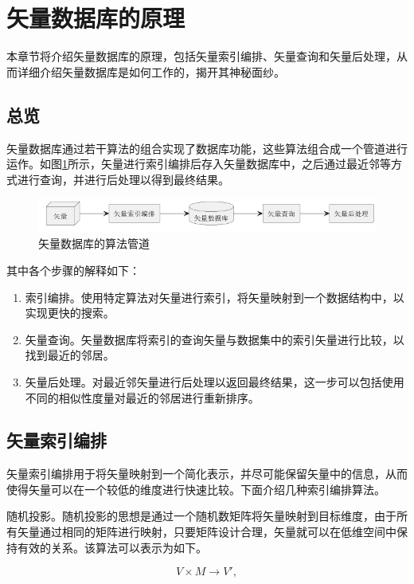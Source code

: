 \section{矢量数据库的原理}

本章节将介绍矢量数据库的原理，包括矢量索引编排、矢量查询和矢量后处理，从而详细介绍矢量数据库是如何工作的，揭开其神秘面纱。

\subsection{总览}

矢量数据库通过若干算法的组合实现了数据库功能，这些算法组合成一个管道进行运作。如图\ref{fig:pipe}所示，矢量进行索引编排后存入矢量数据库中，之后通过最近邻等方式进行查询，并进行后处理以得到最终结果。

\begin{figure}[H]
    \includegraphics[width=\textwidth]{examples/pipe.png}
    \centering
    \caption{矢量数据库的算法管道}
    \label{fig:pipe}
\end{figure}

其中各个步骤的解释如下：
\begin{enumerate}
\item 索引编排。使用特定算法对矢量进行索引，将矢量映射到一个数据结构中，以实现更快的搜索。
\item 矢量查询。矢量数据库将索引的查询矢量与数据集中的索引矢量进行比较，以找到最近的邻居。
\item 矢量后处理。对最近邻矢量进行后处理以返回最终结果，这一步可以包括使用不同的相似性度量对最近的邻居进行重新排序。
\end{enumerate}

\subsection{矢量索引编排}

矢量索引编排用于将矢量映射到一个简化表示，并尽可能保留矢量中的信息，从而使得矢量可以在一个较低的维度进行快速比较。下面介绍几种索引编排算法。

随机投影\cite{bingham2001random}。随机投影的思想是通过一个随机数矩阵将矢量映射到目标维度，由于所有矢量通过相同的矩阵进行映射，只要矩阵设计合理，矢量就可以在低维空间中保持有效的关系。该算法可以表示为如下。

\begin{equation}
    V\times M\to V',
\end{equation}

